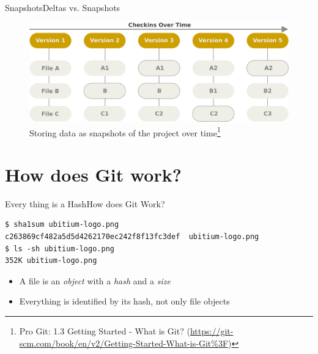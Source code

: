 \documentclass[aspectratio=169]{beamer}
\begin{document}
\begin{frame}{Snapshots}{Deltas vs. Snapshots}
\begin{figure}
    \centering
    \includegraphics[width=\textwidth,height=0.6\textheight,keepaspectratio]{snapshots}
    \caption {
        Storing data as snapshots of the project over time\footnote{
            Pro Git: 1.3 Getting Started - What is Git?
            (\url{https://git-scm.com/book/en/v2/Getting-Started-What-is-Git\%3F})
        }
    }
\end{figure}
\end{frame}

\section{How does Git work?}
\begin{frame}[fragile]{Every thing is a Hash}{How does Git Work?}
\begin{verbatim}
$ sha1sum ubitium-logo.png
c263869cf482a5d5d4262170ec242f8f13fc3def  ubitium-logo.png
$ ls -sh ubitium-logo.png
352K ubitium-logo.png
\end{verbatim}
\begin{itemize}
    \item A file is an \emph{object} with a \emph{hash} and a \emph{size}
    \item Everything is identified by its hash, not only file objects
\end{itemize}
\end{frame}
\end{document}
